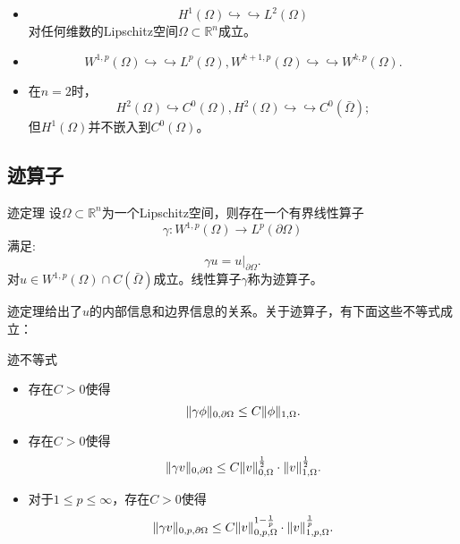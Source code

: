\begin{proposition}
    \begin{itemize}
        \item \begin{equation}
            H^{1}(\Omega)\hookrightarrow\hookrightarrow L^{2}(\Omega)
        \end{equation}
        对任何维数的Lipschitz空间$\Omega\subset\mathbb{R}^{n}$成立。
        \item \begin{equation}
            W^{1,p}(\Omega)\hookrightarrow\hookrightarrow L^{p}(\Omega), W^{k+1,p}(\Omega)\hookrightarrow\hookrightarrow W^{k,p}(\Omega).
        \end{equation}
        \item 在$n=2$时，
        \begin{equation}
            H^{2}(\Omega)\hookrightarrow C^{0}(\Omega), H^{2}(\Omega)\hookrightarrow\hookrightarrow C^{0}(\bar{\Omega});
        \end{equation}
        但$H^{1}(\Omega)$并不嵌入到$C^{0}(\Omega)$。
    \end{itemize}
\end{proposition}   
\subsection{迹算子}
\begin{theorem}{迹定理}
    设$\Omega\subset\mathbb{R}^{n}$为一个Lipschitz空间，则存在一个有界线性算子
    \begin{equation}
        \gamma:W^{1,p}(\Omega)\rightarrow L^{p}(\partial\Omega)
    \end{equation}
    满足:
    \begin{equation}
        \gamma u=u|_{\partial\Omega}.
    \end{equation}
    对$u\in W^{1,p}(\Omega)\cap C(\bar{\Omega})$成立。线性算子$\gamma$称为迹算子。
\end{theorem}
迹定理给出了$u$的内部信息和边界信息的关系。关于迹算子，有下面这些不等式成立：
\begin{proposition}{迹不等式}
    \begin{itemize}
        \item 存在$C>0$使得
        \begin{equation}
            \|\gamma\phi\|_{0,\partial\Omega}\le C\|\phi\|_{1,\Omega}.
        \end{equation}
        \item 存在$C>0$使得
        \begin{equation}
            \|\gamma v\|_{0,\partial\Omega}\le C\|v\|_{0,\Omega}^{\frac{1}{2}}\cdot\|v\|_{1,\Omega}^{\frac{1}{2}}.
        \end{equation}
        \item 对于$1\le p\le \infty$，存在$C>0$使得
        \begin{equation}
            \|\gamma v\|_{0,p,\partial\Omega}\le C\|v\|_{0,p,\Omega}^{1-\frac{1}{p}}\cdot\|v\|_{1,p,\Omega}^{\frac{1}{p}}.
        \end{equation}
    \end{itemize}
\end{proposition}
